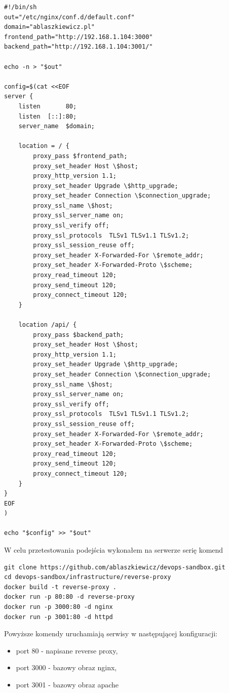 \documentclass{article}
\begin{document}
\begin{lstlisting}[caption=Plik \lstinline|/infrastructure/reverse-proxy/src/nxconf.sh|]
#!/bin/sh
out="/etc/nginx/conf.d/default.conf"
domain="ablaszkiewicz.pl"
frontend_path="http://192.168.1.104:3000"
backend_path="http://192.168.1.104:3001/"

echo -n > "$out"

config=$(cat <<EOF
server {
    listen       80;
    listen  [::]:80;
    server_name  $domain;

    location = / {
        proxy_pass $frontend_path;
        proxy_set_header Host \$host;
        proxy_http_version 1.1;
        proxy_set_header Upgrade \$http_upgrade;
        proxy_set_header Connection \$connection_upgrade;
        proxy_ssl_name \$host;
        proxy_ssl_server_name on;
        proxy_ssl_verify off;
        proxy_ssl_protocols  TLSv1 TLSv1.1 TLSv1.2;
        proxy_ssl_session_reuse off;
        proxy_set_header X-Forwarded-For \$remote_addr;
        proxy_set_header X-Forwarded-Proto \$scheme;
        proxy_read_timeout 120;
        proxy_send_timeout 120;
        proxy_connect_timeout 120;
    }

    location /api/ {
        proxy_pass $backend_path;
        proxy_set_header Host \$host;
        proxy_http_version 1.1;
        proxy_set_header Upgrade \$http_upgrade;
        proxy_set_header Connection \$connection_upgrade;
        proxy_ssl_name \$host;
        proxy_ssl_server_name on;
        proxy_ssl_verify off;
        proxy_ssl_protocols  TLSv1 TLSv1.1 TLSv1.2;
        proxy_ssl_session_reuse off;
        proxy_set_header X-Forwarded-For \$remote_addr;
        proxy_set_header X-Forwarded-Proto \$scheme;
        proxy_read_timeout 120;
        proxy_send_timeout 120;
        proxy_connect_timeout 120;
    }
}
EOF
)

echo "$config" >> "$out"
\end{lstlisting}

W celu przetestowania podejścia wykonałem na serwerze serię komend

\begin{lstlisting}[caption=Komendy włączające reverse proxy na serwerze]
git clone https://github.com/ablaszkiewicz/devops-sandbox.git
cd devops-sandbox/infrastructure/reverse-proxy
docker build -t reverse-proxy .
docker run -p 80:80 -d reverse-proxy
docker run -p 3000:80 -d nginx
docker run -p 3001:80 -d httpd
\end{lstlisting}

Powyższe komendy uruchamiają serwisy w następującej konfiguracji:
\begin{itemize}
    \item port 80 - napisane reverse proxy,
    \item port 3000 - bazowy obraz nginx,
    \item port 3001 - bazowy obraz apache
\end{itemize}
\end{document}
